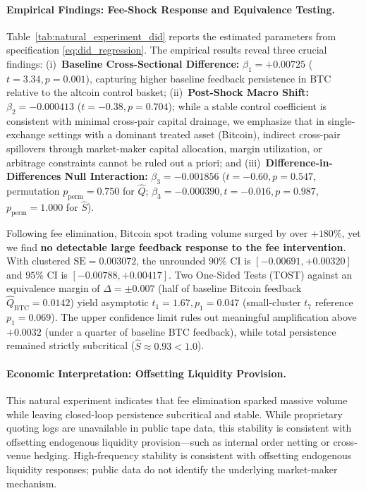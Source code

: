 \documentclass[12pt]{article}
\theoremstyle{definition}
\theoremstyle{remark}
\begin{document}
\paragraph{Empirical Findings: Fee-Shock Response and Equivalence Testing.}
Table~\ref{tab:natural_experiment_did} reports the estimated parameters from specification \eqref{eq:did_regression}. The empirical results reveal three crucial findings: (i)~\textbf{Baseline Cross-Sectional Difference:} $\beta_1 = +0.00725$ ($t = 3.34, p = 0.001$), capturing higher baseline feedback persistence in BTC relative to the altcoin control basket; (ii)~\textbf{Post-Shock Macro Shift:} $\beta_2 = -0.000413$ ($t = -0.38, p = 0.704$); while a stable control coefficient is consistent with minimal cross-pair capital drainage, we emphasize that in single-exchange settings with a dominant treated asset (Bitcoin), indirect cross-pair spillovers through market-maker capital allocation, margin utilization, or arbitrage constraints cannot be ruled out a priori; and (iii)~\textbf{Difference-in-Differences Null Interaction:} $\beta_3 = -0.001856$ ($t = -0.60, p = 0.547$, permutation $p_{\text{perm}} = 0.750$ for $\hat{Q}$; $\beta_3 = -0.000390, t = -0.016, p = 0.987$, $p_{\text{perm}} = 1.000$ for $\hat{S}$).

Following fee elimination, Bitcoin spot trading volume surged by over $+180\%$, yet we find \textbf{no detectable large feedback response to the fee intervention}. With clustered $\text{SE} = 0.003072$, the unrounded $90\%$ CI is $[-0.00691, +0.00320]$ and $95\%$ CI is $[-0.00788, +0.00417]$. Two One-Sided Tests (TOST) against an equivalence margin of $\Delta = \pm 0.007$ (half of baseline Bitcoin feedback $\hat{Q}_{\text{BTC}} = 0.0142$) yield asymptotic $t_1 = 1.67, p_1 = 0.047$ (small-cluster $t_7$ reference $p_1 = 0.069$). The upper confidence limit rules out meaningful amplification above $+0.0032$ (under a quarter of baseline BTC feedback), while total persistence remained strictly subcritical ($\hat{S} \approx 0.93 < 1.0$).

\paragraph{Economic Interpretation: Offsetting Liquidity Provision.}
This natural experiment indicates that fee elimination sparked massive volume while leaving closed-loop persistence subcritical and stable. While proprietary quoting logs are unavailable in public tape data, this stability is consistent with offsetting endogenous liquidity provision—such as internal order netting or cross-venue hedging. High-frequency stability is consistent with offsetting endogenous liquidity responses; public data do not identify the underlying market-maker mechanism.
\end{document}
